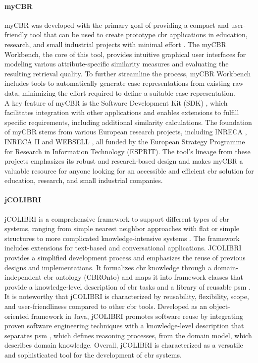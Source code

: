             \paragraph{myCBR}
            myCBR was developed with the primary goal of providing a compact and user-friendly tool that can be used to create prototype \acrfull{cbr} applications in education, research, and small industrial projects with minimal effort \cite{sawalkar2019modeling}. The myCBR Workbench, the core of this tool, provides intuitive graphical user interfaces for modeling various attribute-specific similarity measures and evaluating the resulting retrieval quality. To further streamline the process, myCBR Workbench includes tools to automatically generate case representations from existing raw data, minimizing the effort required to define a suitable case representation.\\
            A key feature of myCBR is the Software Development Kit (SDK) \cite{jaiswal2022f}, which facilitates integration with other applications and enables extensions to fulfill specific requirements, including additional similarity calculations. The foundation of myCBR stems from various European research projects, including INRECA \cite{wilke1995fallbasiertes}, INRECA II and WEBSELL \cite{probSolCBR}, all funded by the European Strategy Programme for Research in Information Technology (ESPRIT). The tool's lineage from these projects emphasizes its robust and research-based design and makes myCBR a valuable resource for anyone looking for an accessible and efficient \acrshort{cbr} solution for education, research, and small industrial companies.

        
            \paragraph{jCOLIBRI}
            jCOLIBRI is a comprehensive framework to support different types of \acrshort{cbr} systems, ranging from simple nearest neighbor approaches with flat or simple structures to more complicated knowledge-intensive systems \cite{wiratunga2011case}. The framework includes extensions for text-based and conversational applications. JCOLIBRI provides a simplified development process and emphasizes the reuse of previous designs and implementations. It formalizes \acrshort{cbr} knowledge through a domain-independent \acrshort{cbr} ontology (CBROnto) and maps it into framework classes that provide a knowledge-level description of \acrshort{cbr} tasks and a library of reusable \acrfull{psm} \cite{diaz2007building}. It is noteworthy that jCOLIBRI is characterized by reusability, flexibility, scope, and user-friendliness compared to other \acrshort{cbr} tools. Developed as an object-oriented framework in Java, jCOLIBRI promotes software reuse by integrating proven software engineering techniques with a knowledge-level description that separates \acrshort{psm} \cite{diaz2007building}, which defines reasoning processes, from the domain model, which describes domain knowledge. Overall, jCOLIBRI is characterized as a versatile and sophisticated tool for the development of \acrshort{cbr} systems.

